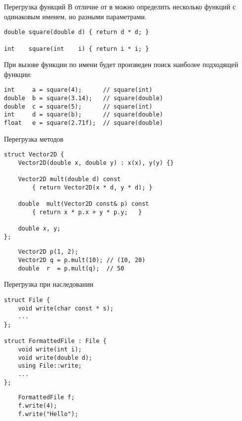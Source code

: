 \documentclass{beamer}
\begin{document}
\begin{frame}[fragile]{Перегрузка функций}
    В отличие от \langc в \langcpp можно определить несколько функций
    с одинаковым именем, но разными параметрами.
    \begin{lstlisting}
double square(double d) { return d * d; }

int    square(int    i) { return i * i; }
    \end{lstlisting}
    При вызове функции по имени будет произведен поиск наиболее подходящей
    функции:
\begin{lstlisting}
int     a = square(4);      // square(int)
double  b = square(3.14);   // square(double)
double  c = square(5);      // square(int)
int     d = square(b);      // square(double)
float   e = square(2.71f);  // square(double)
\end{lstlisting}
\end{frame}

    
\begin{frame}[fragile]{Перегрузка методов}
    \begin{lstlisting}
struct Vector2D {
    Vector2D(double x, double y) : x(x), y(y) {}

    Vector2D mult(double d) const 
        { return Vector2D(x * d, y * d); }
    
    double  mult(Vector2D const& p) const 
        { return x * p.x + y * p.y;   }

    double x, y;
};
\end{lstlisting}

\begin{lstlisting}
    Vector2D p(1, 2);
    Vector2D q = p.mult(10); // (10, 20)
    double  r  = p.mult(q);  // 50 
\end{lstlisting}

\end{frame}

\begin{frame}[fragile]{Перегрузка при наследовании}
    \begin{lstlisting}
struct File {
    void write(char const * s);
    ...
};

struct FormattedFile : File {
    void write(int i);
    void write(double d);
    using File::write;
    ...
};
    \end{lstlisting}

    \begin{lstlisting}
    FormattedFile f;
    f.write(4);
    f.write("Hello");
    \end{lstlisting}

\end{frame}
\end{document}

